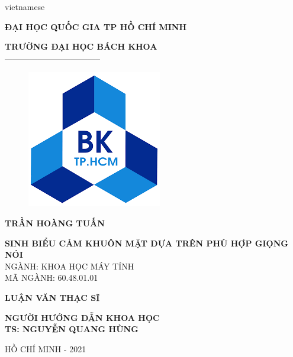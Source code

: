 \begin{titlepage}

\begin{center}

\vspace*{3\bigskipamount}

\begin{otherlanguage*}{vietnamese}

\makeatletter
\fontsize{12}{12}\textbf{ĐẠI HỌC QUỐC GIA TP HỒ CHÍ MINH}
\makeatother

\makeatletter
\fontsize{14}{14}\textbf{TRƯỜNG ĐẠI HỌC BÁCH KHOA}\\
\fontsize{14}{14} -----------------------------------
\makeatother

\begin{figure}[h]
	\centering
    \includegraphics[width=0.4\columnwidth]{./cover/bk.png}
\end{figure}

{\makeatletter
\fontsize{16}{16}\textbf{TRẦN HOÀNG TUẤN}
\makeatother}

\vspace{1cm}

{\makeatletter
\fontsize{16}{16}\textbf{SINH BIỂU CẢM KHUÔN MẶT DỰA TRÊN PHÙ HỢP GIỌNG NÓI}\\
\vspace{1cm}
\fontsize{12}{12} NGÀNH: KHOA HỌC MÁY TÍNH\\
\fontsize{12}{12} MÃ NGÀNH: 60.48.01.01\\
\makeatother}

\vspace{1cm}
{\makeatletter
\fontsize{12}{12}\textbf{LUẬN VĂN THẠC SĨ}\\
\makeatother}

\vspace{1cm}
{\makeatletter
\fontsize{12}{12}\textbf{NGƯỜI HƯỚNG DẪN KHOA HỌC}\\
\fontsize{12}{12}\textbf{TS: NGUYỄN QUANG HÙNG}\\
\makeatother}

\vspace{4cm}
{\makeatletter
\fontsize{12}{12} HỒ CHÍ MINH - 2021\\
\makeatother}

\end{otherlanguage*}

\vfill
\end{center}
\end{titlepage}

